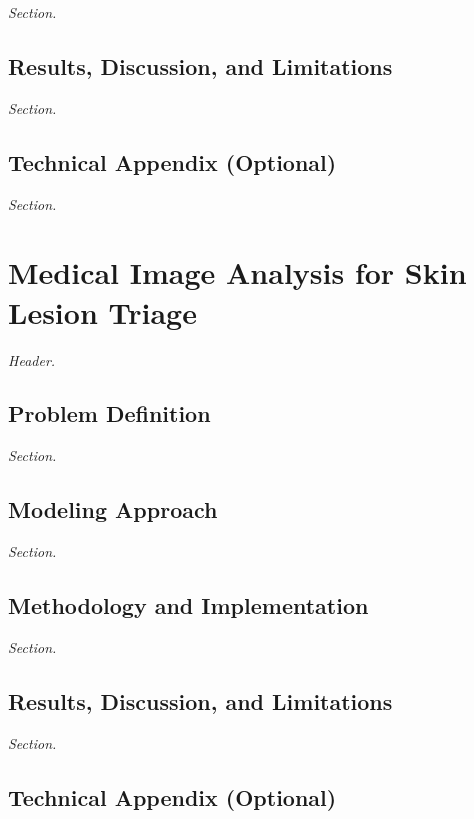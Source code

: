 \documentclass[
  12pt,
  letterpaper,
]{book}
\begin{document}
\emph{Section.}

\section{Results, Discussion, and
Limitations}\label{results-discussion-and-limitations-6}

\emph{Section.}

\section{Technical Appendix
(Optional)}\label{technical-appendix-optional-5}

\emph{Section.}

\chapter{Medical Image Analysis for Skin Lesion
Triage}\label{medical-image-analysis-for-skin-lesion-triage}

\emph{Header.}

\section{Problem Definition}\label{problem-definition-7}

\emph{Section.}

\section{Modeling Approach}\label{modeling-approach-7}

\emph{Section.}

\section{Methodology and
Implementation}\label{methodology-and-implementation-7}

\emph{Section.}

\section{Results, Discussion, and
Limitations}\label{results-discussion-and-limitations-7}

\emph{Section.}

\section{Technical Appendix
(Optional)}\label{technical-appendix-optional-6}
\end{document}

